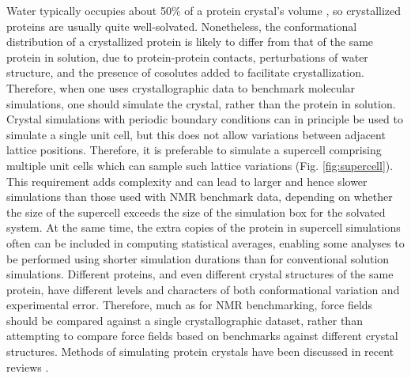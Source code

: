 \documentclass[9pt,review]{livecoms}
\begin{document}
Water typically occupies about 50\% of a protein crystal’s volume \cite{altan_learning_2018}, so crystallized proteins are usually quite well-solvated.
Nonetheless, the conformational distribution of a crystallized protein is likely to differ from that of the same protein in solution, due to protein-protein contacts, perturbations of water structure, and the presence of cosolutes added to facilitate crystallization.
Therefore, when one uses crystallographic data to benchmark molecular simulations, one should simulate the crystal, rather than the protein in solution.
Crystal simulations with periodic boundary conditions can in principle be used to simulate a single unit cell, but this does not allow variations between adjacent lattice positions.
Therefore, it is preferable to simulate a supercell comprising multiple unit cells which can sample such lattice variations (Fig. \ref{fig:supercell}).
This requirement adds complexity and can lead to larger and hence slower simulations than those used with NMR benchmark data, depending on whether the size of the supercell exceeds the size of the simulation box for the solvated system.
At the same time, the extra copies of the protein in supercell simulations often can be included in computing statistical averages, enabling some analyses to be performed using shorter simulation durations than for conventional solution simulations. 
Different proteins, and even different crystal structures of the same protein, have different levels and characters of both conformational variation and experimental error.
Therefore, much as for NMR benchmarking, force fields should be compared against a single crystallographic dataset, rather than attempting to compare force fields based on benchmarks against different crystal structures.
Methods of simulating protein crystals have been discussed in recent reviews \cite{cerutti_molecular_2019,wych_molecular-dynamics_2023}.
\end{document}
